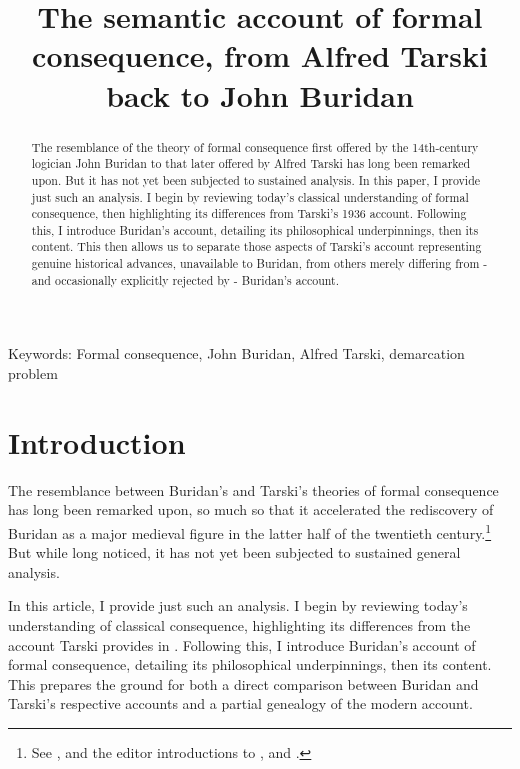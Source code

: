 \documentclass[]{article}
\title{The semantic account of formal consequence, from Alfred Tarski back to John Buridan}
\author{}
\begin{document}
	
\maketitle
\begin{abstract}
	The resemblance of the theory of formal consequence first offered by the 14th-century logician John Buridan to that later offered by Alfred Tarski has long been remarked upon. But it has not yet been subjected to sustained analysis. In this paper, I provide just such an analysis. I begin by reviewing today's classical understanding of formal consequence, then highlighting its differences from Tarski's 1936 account. Following this, I introduce Buridan's account, detailing its philosophical underpinnings, then its content. This then allows us to separate those aspects of Tarski's account representing genuine historical advances, unavailable to Buridan, from others merely differing from - and occasionally explicitly rejected by - Buridan's account.
\end{abstract}
Keywords: Formal consequence, John Buridan, Alfred Tarski, demarcation problem

\section{Introduction}
The resemblance between Buridan's and Tarski's theories of formal consequence has long been remarked upon, 
so much so that it accelerated the rediscovery of Buridan as a major medieval figure in the latter half of the twentieth century.\footnote{See \cite{Moody1952} \cite{Kneale1962} \cite{Dumitriu1974} \cite{DutilhNovaes2012a} \cite{DutilhNovaes2012c} \cite{Parsons2014}, and the editor introductions to \cite{BuridanTC}, \cite{Kretzmann1982} and \cite{King1985}.} 
But while long noticed, 
it has not yet been subjected to sustained general analysis.

In this article, 
I provide just such an analysis. 
I begin by reviewing today's understanding of classical consequence, 
highlighting its differences from the account Tarski provides in \cite{Tarski2002}. 
Following this, 
I introduce Buridan's account of formal consequence, 
detailing its philosophical underpinnings, 
then its content. 
This prepares the ground for both a direct comparison between Buridan and Tarski's respective accounts and a partial genealogy of the modern account.
\end{document}
